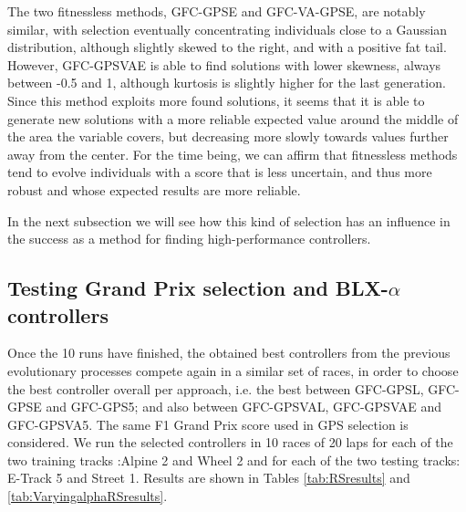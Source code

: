 \documentclass[10pt,journal,compsoc]{IEEEtran}
\begin{document}
The two fitnessless methods, {\sf GFC-GPSE} and {\sf GFC-VA-GPSE}, are
notably similar, with selection eventually concentrating individuals
close to a Gaussian distribution, although slightly skewed to the
right, and with a positive fat tail. However, {\sf GFC-GPSVAE} is able
to find solutions with lower skewness, always between -0.5 and 1,
although kurtosis is slightly higher for the last generation. Since
this method exploits more found solutions, it seems that it is able to
generate new solutions with a more reliable expected value around the
middle of the area the variable covers, but decreasing more slowly
towards values further away from the center. For the time being,
we can affirm that fitnessless methods tend to evolve individuals
with a score that is less uncertain, and thus more robust and whose
expected results are more reliable.

In the next subsection we will see how this kind of selection has an influence in the success as a method for finding high-performance controllers.



\subsection{Testing Grand Prix selection and BLX-$\alpha$ controllers}


Once the 10 runs have finished, the obtained best controllers from the
previous evolutionary processes compete again in a similar set of races, in order to choose the best controller overall per approach, i.e. the best between {\sf GFC-GPSL}, {\sf GFC-GPSE} and {\sf GFC-GPS5}; and also between {\sf GFC-GPSVAL}, {\sf GFC-GPSVAE} and {\sf GFC-GPSVA5}. The same F1 Grand Prix score used in GPS selection is considered. We run the selected controllers in 10 races of 20 laps for each of the two training tracks :Alpine 2  and Wheel 2  and  for each of the two testing tracks: E-Track 5 and Street 1. Results are shown in Tables \ref{tab:RSresults} and \ref{tab:VaryingalphaRSresults}.
\end{document}
